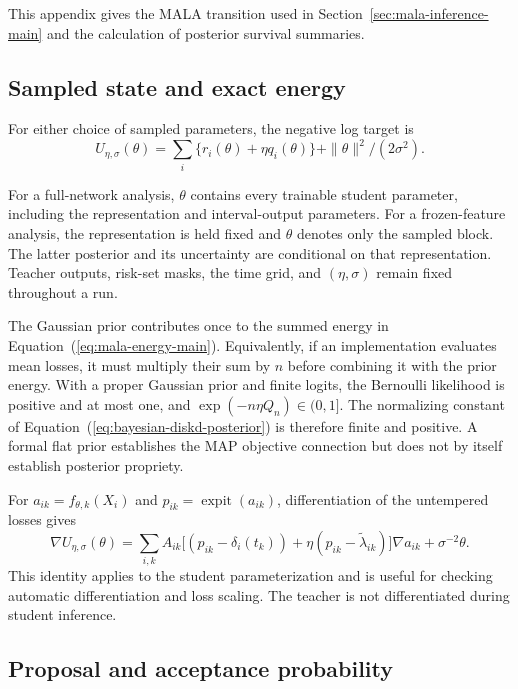 \documentclass{article} %
\renewcommand{\eqref}[1]{\textup{(\ref{#1})}}
\DeclareMathOperator{\expit}{expit}
\begin{document}
This appendix gives the MALA transition used in Section~\ref{sec:mala-inference-main} and the calculation of posterior survival summaries.

\subsection{Sampled state and exact energy}

For either choice of sampled parameters, the negative log target is
\begin{equation}
U_{\eta,\sigma}(\theta)=\sum_i\{r_i(\theta)+\eta q_i(\theta)\}+\|\theta\|^2/(2\sigma^2).
\label{eq:mala-energy-main}
\end{equation}

For a full-network analysis, $\theta$ contains every trainable student parameter, including the representation and interval-output parameters. For a frozen-feature analysis, the representation is held fixed and $\theta$ denotes only the sampled block. The latter posterior and its uncertainty are conditional on that representation. Teacher outputs, risk-set masks, the time grid, and $(\eta,\sigma)$ remain fixed throughout a run.

The Gaussian prior contributes once to the summed energy in Equation~\eqref{eq:mala-energy-main}. Equivalently, if an implementation evaluates mean losses, it must multiply their sum by $n$ before combining it with the prior energy. With a proper Gaussian prior and finite logits, the Bernoulli likelihood is positive and at most one, and $\exp(-n\eta Q_n)\in(0,1]$. The normalizing constant of Equation~\eqref{eq:bayesian-diskd-posterior} is therefore finite and positive. A formal flat prior establishes the MAP objective connection but does not by itself establish posterior propriety.

For $a_{ik}=f_{\theta,k}(X_i)$ and $p_{ik}=\expit(a_{ik})$, differentiation of the untempered losses gives
\begin{equation}
\nabla U_{\eta,\sigma}(\theta)
=\sum_{i,k}A_{ik}
\bigl[(p_{ik}-\delta_i(t_k))+\eta(p_{ik}-\widetilde\lambda_{ik})\bigr]
\nabla a_{ik}+\sigma^{-2}\theta.
\label{eq:neural-energy-gradient}
\end{equation}
This identity applies to the student parameterization and is useful for checking automatic differentiation and loss scaling. The teacher is not differentiated during student inference.

\subsection{Proposal and acceptance probability}
\end{document}

